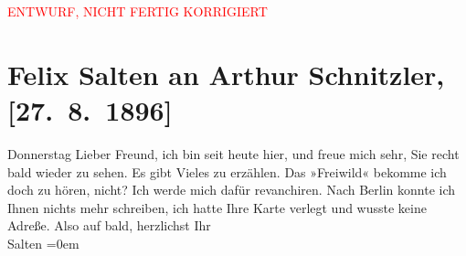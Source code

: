 
\begin{center}
            \textcolor{red}{ENTWURF, NICHT FERTIG KORRIGIERT}
                      \end{center}
            
         \renewcommand{\erwaehnteOrte}{Orte: Berlin, Wien}
         \renewcommand{\erwaehnteWerke}{Werke: Freiwild. Schauspiel in 3 Akten}
               \section[Felix Salten an Arthur Schnitzler, {[}27. 8. 1896{]}]{ Felix Salten an Arthur Schnitzler, {[}27. 8. 1896{]}}\nopagebreak{}\rehead{ }\begin{ledgroupsized}[t]{13cm}\normalsize\beginnumbering \toendnotes[C]{\smallbreak\pagebreak[2]} 
\pstart
           \raggedleft{}{\pb}Donnerstag\pend
           \pstart
           Lieber Freund, ich bin seit heute hier, und freue mich sehr, Sie
               recht bald wieder zu sehen. Es gibt Vieles zu erzählen. Das »Freiwild« bekomme ich doch zu hören, nicht? Ich werde mich
               dafür revanchiren. Nach Berlin konnte ich Ihnen
               nichts mehr schreiben, ich hatte Ihre Karte verlegt und wusste keine Adreße.\pend
           \pstart
           Also auf bald, herzlichst Ihr {\\[\baselineskip]}\spacefill\mbox{Salten}\pend
           \leftskip=0em{}
         
         \endnumbering{}\end{ledgroupsized}\begin{anhang}\end{anhang}\newcommand{\dateiname}{L03179}\newcommand{\titel}{Felix Salten an Arthur Schnitzler, [27. 8. 1896]}\newcommand{\editorInnen}{Martin Anton Müller und Laura Untner}
      